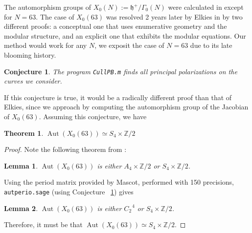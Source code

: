 \documentclass[12pt,reqno]{amsart}
\DeclareMathOperator{\Aut}{Aut}
\DeclareMathOperator{\Jac}{Jac}
\newcommand{\Z}{\mathbb{Z}}
\newtheorem*{thm*}{Theorem}
\newtheorem*{lemma*}{Lemma}
\newtheorem{conjecture}[theorem]{Conjecture}
\theoremstyle{definition}
\theoremstyle{remark}
\begin{document}
The automorphism groups of $X_0(N) := \mathfrak{h}^{+} / \Gamma_0(N)$ were calculated in \cite{km} except for $N=63$. The case of $X_0(63)$ was resolved 2 years later by Elkies in \cite{elkies} by two different proofs: a conceptual one that uses enumerative geometry and the modular structure, and an explicit one that exhibits the modular equations. Our method would work for any $N$, we exposit the case of $N=63$ due to its late blooming history.


\begin{conjecture} \label{63conj} The program \texttt{CullPB.m} finds all principal polarizations on the curves we consider. \end{conjecture}

If this conjecture is true, it would be a radically different proof than that of Elkies, since we approach by computing the automorphism group of the Jacobian of $X_0(63)$. Assuming this conjecture, we have

\begin{thm*} $\Aut(X_0(63)) \simeq S_4 \times \Z/2$ \end{thm*} 

\begin{proof} Note the following theorem from \cite{km}: 

\begin{lemma*} $\Aut(X_0(63))$ is either $A_4 \times \Z/2$ or $S_4 \times \Z/2$. 
\end{lemma*}

Using the period matrix provided by Mascot, performed with 150 precisions, \texttt{autperio.sage} (using Conjecture ~\ref{63conj}) gives

\begin{lemma*} $\Aut(X_0(63))$ is either $C_2^{\text{ }4}$ or $S_4 \times \Z/2$.
\end{lemma*}

Therefore, it must be that $\Aut(X_0(63)) \simeq S_4 \times \Z/2$. 
\end{proof} 
\end{document}
